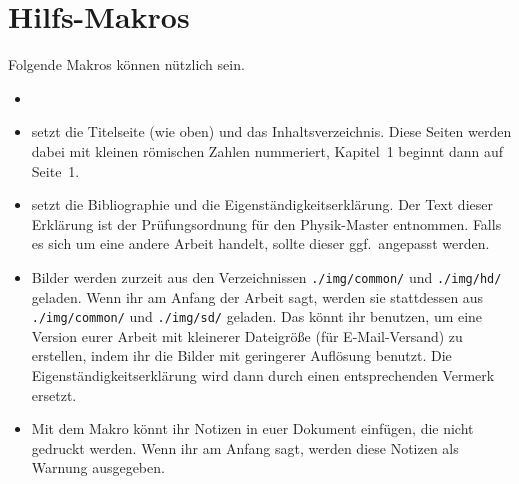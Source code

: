 \section{Hilfs-Makros}
Folgende Makros können nützlich sein.
\begin{itemize}
  \item {}
  
  \item \texttt{\string\makedocumentstart} setzt die Titelseite (wie oben) und das Inhaltsverzeichnis.
    Diese Seiten werden dabei mit kleinen römischen Zahlen nummeriert, Kapitel~1 beginnt dann auf Seite~1.
    
  \item \texttt{\string\makedocumentend} setzt die Bibliographie und die Eigenständigkeitserklärung.
    Der Text dieser Erklärung ist der Prüfungsordnung für den Physik-Master entnommen.
    Falls es sich um eine andere Arbeit handelt, sollte dieser ggf.~angepasst werden.
    
  \item Bilder werden zurzeit aus den Verzeichnissen \texttt{./img/common/} und \texttt{./img/hd/} geladen.
    Wenn ihr am Anfang der Arbeit \texttt{\string\reducesizetrue} sagt, werden sie stattdessen aus \texttt{./img/common/} und \texttt{./img/sd/} geladen.
    Das könnt ihr benutzen, um eine Version eurer Arbeit mit kleinerer Dateigröße (für E-Mail-Versand) zu erstellen, indem ihr die Bilder mit geringerer Auflösung benutzt.
    Die Eigenständigkeitserklärung wird dann durch einen entsprechenden Vermerk ersetzt.
    
  \item Mit dem Makro \texttt{\string\todo} könnt ihr Notizen in euer Dokument einfügen, die nicht gedruckt werden.
    Wenn ihr am Anfang \texttt{\string\showtodostrue} sagt, werden diese Notizen als Warnung ausgegeben.
\end{itemize}

